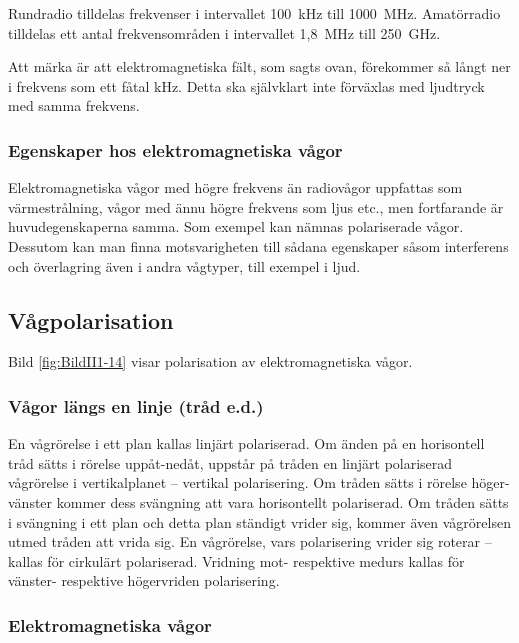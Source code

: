 Rundradio tilldelas frekvenser i intervallet 100~kHz till 1000~MHz.
Amatörradio tilldelas ett antal frekvensområden i intervallet 1,8~MHz till
250~GHz.

Att märka är att elektromagnetiska fält, som sagts ovan, förekommer så långt
ner i frekvens som ett fåtal kHz.
Detta ska självklart inte förväxlas med ljudtryck med samma frekvens.

\subsubsection{Egenskaper hos elektromagnetiska vågor}

Elektromagnetiska vågor med högre frekvens än radiovågor uppfattas som
värmestrålning, vågor med ännu högre frekvens som ljus etc., men fortfarande är
huvudegenskaperna samma.
Som exempel kan nämnas polariserade vågor.
Dessutom kan man finna motsvarigheten till sådana egenskaper såsom interferens
och överlagring även i andra vågtyper, till exempel i ljud.

\subsection{Vågpolarisation}
\label{vågpolarisation}


Bild \ref{fig:BildII1-14} visar polarisation av elektromagnetiska vågor.

\subsubsection{Vågor längs en linje (tråd e.d.)}
En vågrörelse i ett plan kallas linjärt polariserad.
Om änden på en horisontell tråd sätts i rörelse uppåt-nedåt, uppstår på tråden
en linjärt polariserad vågrörelse i vertikalplanet -- vertikal polarisering.
Om tråden sätts i rörelse höger-vänster kommer dess svängning att vara
horisontellt polariserad.
Om tråden sätts i svängning i ett plan och detta plan ständigt vrider sig,
kommer även vågrörelsen utmed tråden att vrida sig.
En vågrörelse, vars polarisering vrider sig roterar -- kallas för cirkulärt
polariserad.
Vridning mot- respektive medurs kallas för vänster- respektive högervriden
polarisering.

\subsubsection{Elektromagnetiska vågor}

